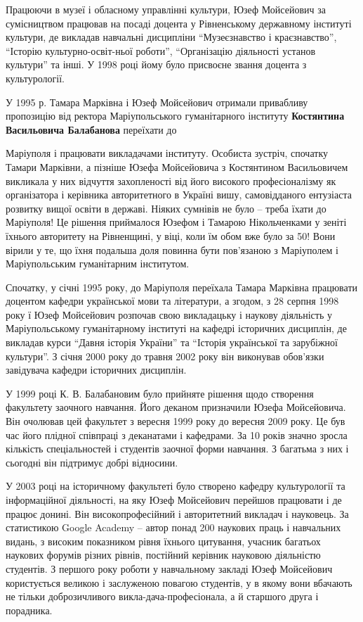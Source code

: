 Працюючи в музеї і обласному управлінні культури, Юзеф Мойсейович за
сумісництвом працював на посаді доцента у Рівненському державному інституті
культури, де викладав навчальні дисципліни \enquote{Музеєзнавство і краєзнавство},
\enquote{Історію культурно-освіт\hyp{}ньої роботи}, \enquote{Організацію діяльності установ культури}
та інші. У 1998 році йому було присвоєне звання доцента з культурології.

У 1995 р. Тамара Марківна і Юзеф Мойсейович отримали привабливу пропозицію від
ректора Маріупольського гуманітарного інституту \textbf{Костянтина Васильовича
Балабанова} переїхати до\par\noindent Маріуполя і працювати викладачами інституту. Особиста
зустріч, спочатку Тамари Марківни, а пізніше Юзефа Мойсейовича з Костянтином
Васильовичем викликала у них відчуття захопленості від його високого
професіоналізму як організатора і керівника авторитетного в Україні вишу,
самовідданого ентузіаста розвитку вищої освіти в державі. Ніяких сумнівів не
було – треба їхати до Маріуполя! Це рішення приймалося Юзефом і Тамарою
Нікольченками у зеніті їхнього авторитету на Рівненщині, у віці, коли їм обом
вже було за 50! Вони вірили у те, що їхня подальша доля повинна бути пов'язаною
з Маріуполем і Маріупольським гуманітарним інститутом.

Спочатку, у січні 1995 року, до Маріуполя переїхала Тамара Марківна працювати
доцентом кафедри української мови та літератури, а згодом, з 28 серпня 1998
року ї Юзеф Мойсейович розпочав свою викладацьку і наукову діяльність у
Маріупольському гуманітарному інституті на кафедрі історичних дисциплін, де
викладав курси \enquote{Давня історія України} та \enquote{Історія української та зарубіжної
культури}. З січня 2000 року до травня 2002 року він виконував обов'язки
завідувача кафедри історичних дисциплін.

У 1999 році К. В. Балабановим було прийняте рішення щодо створення факультету
заочного навчання. Його деканом призначили Юзефа Мойсейовича. Він очолював цей
факультет з вересня 1999 року до вересня 2009 року. Це був час його плідної
співпраці з деканатами і кафедрами. За 10 років значно зросла кількість
спеціальностей і студентів заочної форми навчання. З багатьма з них і сьогодні
він підтримує добрі відносини.


У 2003 році на історичному факультеті було створено кафедру культурології та
інформаційної діяльності, на яку Юзеф Мойсейович перейшов працювати і де працює
донині. Він високопрофесійний і авторитетний викладач і науковець. За
статистикою Google Academy – автор понад 200 наукових праць і навчальних
видань, з високим показником рівня їхнього цитування, учасник багатьох наукових
форумів різних рівнів, постійний керівник науковою діяльністю студентів. З
першого року роботи у навчальному закладі Юзеф Мойсейович користується великою
і заслуженою повагою студентів, у в якому вони вбачають не тільки
доброзичливого викла\hyp{}дача-професіонала, а й старшого друга і порадника.

